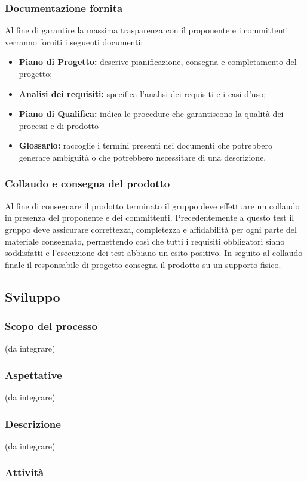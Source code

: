 \subsubsection{Documentazione fornita}
Al fine di garantire la massima trasparenza con il proponente e i committenti verranno forniti i seguenti documenti:
\begin{itemize}
	\item \textbf{Piano di Progetto:} descrive pianificazione, consegna e completamento del progetto;
	\item \textbf{Analisi dei requisiti:} specifica l'analisi dei requisiti e i casi d'uso;
	\item \textbf{Piano di Qualifica:} indica le procedure che garantiscono la qualità dei processi e di prodotto
	\item \textbf{Glossario:} raccoglie i termini presenti nei documenti che potrebbero generare ambiguità o che potrebbero necessitare di una descrizione.
\end{itemize}
\subsubsection{Collaudo e consegna del prodotto}
Al fine di consegnare il prodotto terminato il gruppo deve effettuare un collaudo in presenza del proponente e dei committenti. Precedentemente a questo test il gruppo deve assicurare correttezza, completezza e affidabilità per ogni parte del materiale consegnato, permettendo così che tutti i requisiti obbligatori siano soddisfatti e l'esecuzione dei test abbiano un esito positivo. In seguito al collaudo finale il responsabile di progetto consegna il prodotto su un supporto fisico.                  
\subsection{Sviluppo}
\subsubsection{Scopo del processo}
(da integrare)
\subsubsection{Aspettative}
(da integrare)
\subsubsection{Descrizione}
(da integrare)
\subsubsection{Attività}
